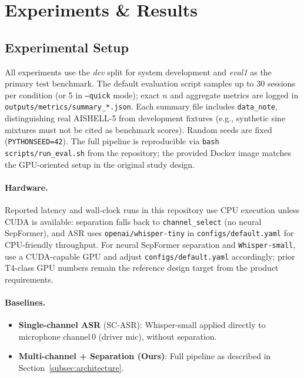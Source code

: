 
\section{Experiments \& Results}
\label{sec:experiments}

\subsection{Experimental Setup}

All experiments use the \textit{dev} split for system development and
\textit{eval1} as the primary test benchmark. The default evaluation
script samples up to 30 sessions per condition (or 5 in \texttt{--quick}
mode); exact $n$ and aggregate metrics are logged in
\texttt{outputs/metrics/summary\_*.json}. Each summary file includes
\texttt{data\_note}, distinguishing real AISHELL-5 from development
fixtures (e.g., synthetic sine mixtures must not be cited as benchmark
scores). Random seeds are fixed (\texttt{PYTHONSEED=42}). The full
pipeline is reproducible via \texttt{bash scripts/run\_eval.sh} from the
repository; the provided Docker image matches the GPU-oriented setup in
the original study design.

\paragraph{Hardware.} Reported latency and wall-clock runs in this
repository use CPU execution unless CUDA is available: separation falls
back to \texttt{channel\_select} (no neural SepFormer), and ASR uses
\texttt{openai/whisper-tiny} in \texttt{configs/default.yaml} for
CPU-friendly throughput. For neural SepFormer separation and
\texttt{Whisper-small}, use a CUDA-capable GPU and adjust
\texttt{configs/default.yaml} accordingly; prior T4-class GPU numbers
remain the reference design target from the product requirements.

\paragraph{Baselines.}
\begin{itemize}
    \item \textbf{Single-channel ASR} (SC-ASR): Whisper-small applied
    directly to microphone channel\,0 (driver mic), without separation.
    \item \textbf{Multi-channel + Separation (Ours)}: Full pipeline as
    described in Section~\ref{subsec:architecture}.
\end{itemize}

